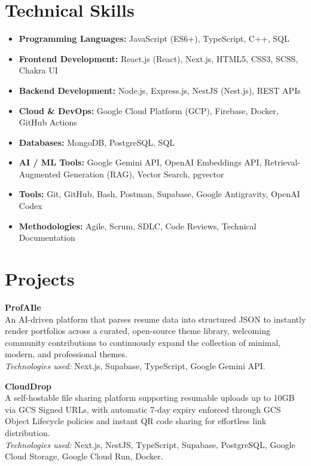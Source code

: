 \documentclass[10pt,a4paper]{article}
\begin{document}
\section*{Technical Skills}
\begin{itemize}
  \item \textbf{Programming Languages:} JavaScript (ES6+), TypeScript, C++, SQL
  \item \textbf{Frontend Development:} React.js (React), Next.js, HTML5, CSS3, SCSS, Chakra UI
  \item \textbf{Backend Development:} Node.js, Express.js, NestJS (Nest.js), REST APIs
  \item \textbf{Cloud \& DevOps:} Google Cloud Platform (GCP), Firebase, Docker, GitHub Actions
  \item \textbf{Databases:} MongoDB, PostgreSQL, SQL
  \item \textbf{AI / ML Tools:} Google Gemini API, OpenAI Embeddings API, \mbox{Retrieval-Augmented} Generation (RAG), Vector Search, pgvector
  \item \textbf{Tools:} Git, GitHub, Bash, Postman, Supabase, Google Antigravity, OpenAI Codex
  \item \textbf{Methodologies:} Agile, Scrum, SDLC, Code Reviews, Technical Documentation
\end{itemize}

\section*{Projects}
\textbf{ProfAIle}\\
An AI-driven platform that parses resume data into structured JSON to instantly render portfolios across a curated, open-source theme library, welcoming community contributions to continuously expand the collection of minimal, modern, and professional themes.\\
\textit{Technologies used:} Next.js, Supabase, TypeScript, Google Gemini API.

\vspace{2pt}
\noindent\textbf{CloudDrop}\\
A self-hostable file sharing platform supporting resumable uploads up to 10GB via GCS Signed URLs, with automatic 7-day expiry enforced through GCS Object Lifecycle policies and instant QR code sharing for effortless link distribution.\\
\textit{Technologies used:} Next.js, NestJS, TypeScript, Supabase, PostgreSQL, Google Cloud Storage, Google Cloud Run, Docker.
\end{document}
